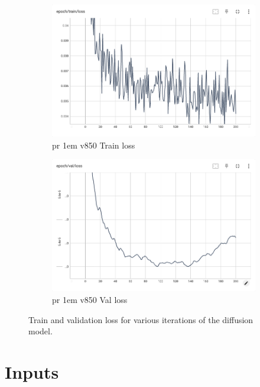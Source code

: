 \begin{figure}
  \centering
  \begin{subfigure}[b]{0.4\textwidth}
    \centering
    \includegraphics[width=\textwidth]{chapters/figures/3_md/loss/pr-1em-v850-train-loss.png}
      \caption{pr 1em v850 Train loss}
      \label{fig:md:1em-v850-train-loss}
  \end{subfigure}
  \hfill
  \begin{subfigure}[b]{0.4\textwidth}
      \centering
      \includegraphics[width=\textwidth]{chapters/figures/3_md/loss/pr-1em-v850-val-loss.png}
      \caption{pr 1em v850 Val loss}
      \label{fig:md:1em-v850-val-loss}
  \end{subfigure}
  \hfill
  \caption{Train and validation loss for various iterations of the diffusion model.}
  \label{fig:md:loss}
\end{figure}


\section{Inputs}


